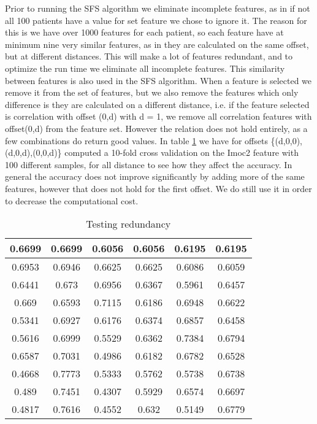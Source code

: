 Prior to running the SFS algorithm we eliminate incomplete features, as in if not all 100 patients have a value for set feature we chose to ignore it. The reason for this is we have over 1000 features for each patient, so each feature have at minimum nine very similar features, as in they are calculated on the same offset, but at different distances. This will make a lot of features redundant, and to optimize the run time we eliminate all incomplete features. This similarity between features is also used in the SFS algorithm. When a feature is selected we remove it from the set of features, but we also remove the features which only difference is they are calculated on a different distance, i.e. if the feature selected is correlation with offset (0,d) with d = 1, we remove all correlation features with offset(0,d) from the feature set.
However the relation does not hold entirely, as a few combinations do return good values. In table \ref{tab:TestOfRedundancy} we have for offsets \{(d,0,0),(d,0,d),(0,0,d)\} computed a 10-fold cross validation on the Imoc2 feature with 100 different samples, for all distance to see how they affect the accuracy. In general the accuracy does not improve significantly by adding more of the same features, however that does not hold for the first offset. We do still use it in order to decrease the computational cost.

\begin{table}[H]
  \centering

    \begin{tabular}{|c|c|c|c|c|c|}
    \hline
    0.6699 & 0.6699 & 0.6056 & 0.6056 & 0.6195 & 0.6195 \\ \hline
    0.6953 & 0.6946 & 0.6625 & 0.6625 & 0.6086 & 0.6059 \\ \hline
    0.6441 & 0.673 & 0.6956 & 0.6367 & 0.5961 & 0.6457 \\ \hline
    0.669 & 0.6593 & 0.7115 & 0.6186 & 0.6948 & 0.6622 \\ \hline
    0.5341 & 0.6927 & 0.6176 & 0.6374 & 0.6857 & 0.6458 \\ \hline
    0.5616 & 0.6999 & 0.5529 & 0.6362 & 0.7384 & 0.6794 \\ \hline
    0.6587 & 0.7031 & 0.4986 & 0.6182 & 0.6782 & 0.6528 \\ \hline
    0.4668 & 0.7773 & 0.5333 & 0.5762 & 0.5738 & 0.6738 \\ \hline
    0.489 & 0.7451 & 0.4307 & 0.5929 & 0.6574 & 0.6697 \\ \hline
    0.4817 & 0.7616 & 0.4552 & 0.632 & 0.5149 & 0.6779 \\
    \hline
    \end{tabular}%
  \caption{Testing redundancy}\label{tab:TestOfRedundancy}%
\end{table}%


